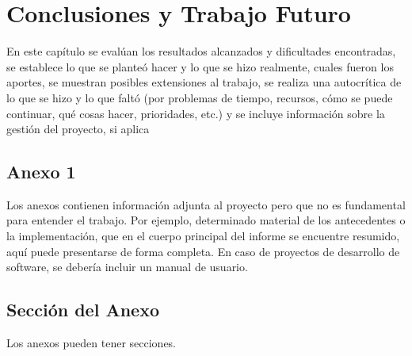 \documentclass[oneside]{prgrado}
\begin{document}

\chapter{Conclusiones y Trabajo Futuro}

En este capítulo se evalúan los resultados alcanzados y
dificultades encontradas, se establece lo que se planteó hacer y lo que se hizo
realmente, cuales fueron los aportes, se muestran posibles extensiones al trabajo, se
realiza una autocrítica de lo que se hizo y lo que faltó (por problemas de tiempo,
recursos, cómo se puede continuar, qué cosas hacer, prioridades, etc.) y se incluye
información sobre la gestión del proyecto, si aplica


{ %

\backmatter %


\newpage



} %



\begin{appendix}

\chapter{Anexo 1}

Los anexos contienen información adjunta al proyecto pero que no es fundamental
para entender el trabajo. Por ejemplo, determinado material de los antecedentes o la
implementación, que en el cuerpo principal del informe se encuentre resumido, aquí
puede presentarse de forma completa. En caso de proyectos de desarrollo de
software, se debería incluir un manual de usuario.

\section{Sección del Anexo}

Los anexos pueden tener secciones.

\end{appendix}


\end{document}
